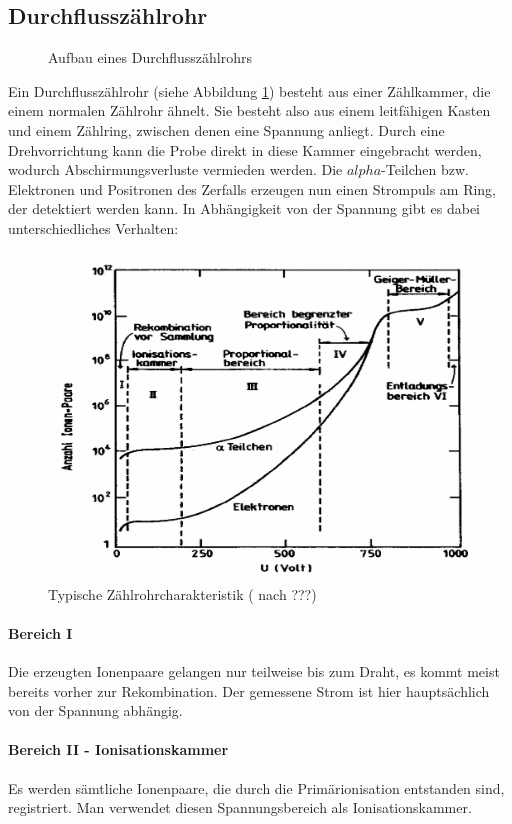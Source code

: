\subsection{Durchflusszählrohr}
\begin{figure}[H]
 \caption{Aufbau eines Durchflusszählrohrs}
 \label{durchflusszaehlrohr}
\end{figure}
Ein Durchflusszählrohr (siehe Abbildung \ref{durchflusszaehlrohr}) besteht aus einer Zählkammer, die einem normalen Zählrohr ähnelt. Sie besteht also aus einem leitfähigen Kasten und einem Zählring, zwischen denen eine Spannung anliegt. Durch eine Drehvorrichtung kann die Probe direkt in diese Kammer eingebracht werden, wodurch Abschirmungsverluste vermieden werden. Die $alpha$-Teilchen bzw. Elektronen und Positronen des Zerfalls erzeugen nun einen Strompuls am Ring, der detektiert werden kann. In Abhängigkeit von der Spannung gibt es dabei unterschiedliches Verhalten:
\begin{figure}[H]
 \centering \includegraphics[width=0.9\linewidth]{Bilder/zaehlrohrcharakteristik.png}
 \caption{Typische Zählrohrcharakteristik ( nach ???)}
\end{figure}
\paragraph{Bereich I} Die erzeugten Ionenpaare gelangen nur teilweise bis zum Draht, es kommt meist bereits vorher zur Rekombination. Der gemessene Strom ist hier hauptsächlich von der Spannung abhängig.
\paragraph{Bereich II - Ionisationskammer} Es werden sämtliche Ionenpaare, die durch die Primärionisation entstanden sind, registriert. Man verwendet diesen Spannungsbereich als Ionisationskammer.
